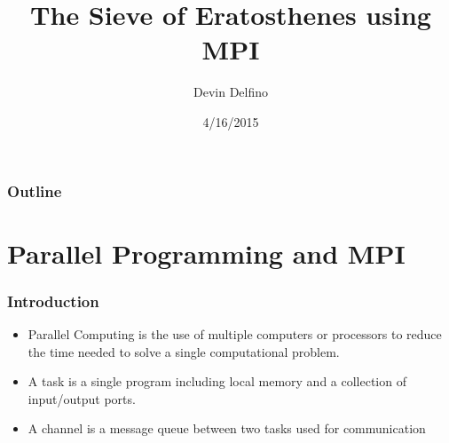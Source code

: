 \documentclass[13pt]{beamer}
\title{The Sieve of Eratosthenes using MPI}
\author{Devin Delfino}
\institute{Comp 401: Senior Seminar}
\date{4/16/2015}
\begin{document}
\frame{\titlepage}


\begin{frame}
\frametitle{Outline}
\tableofcontents
\end{frame}

\section{Parallel Programming and MPI} %
\begin{frame}
\frametitle{Introduction}

\begin{itemize}
  \item \alert{Parallel Computing} is the use of multiple computers or processors to reduce the time needed to solve a single computational problem.
  \item A \alert{task} is a single program including local memory and a collection of input/output ports.
  \item A \alert{channel} is a message queue between two tasks used for communication
\end{itemize}
\end{frame}
\end{document}

